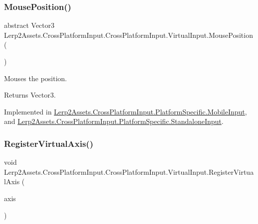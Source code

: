\subsubsection{\texorpdfstring{Mouse\+Position()}{MousePosition()}}
{\footnotesize\ttfamily abstract Vector3 Lerp2\+Assets.\+Cross\+Platform\+Input.\+Cross\+Platform\+Input.\+Virtual\+Input.\+Mouse\+Position (\begin{DoxyParamCaption}{ }\end{DoxyParamCaption})\hspace{0.3cm}{\ttfamily [pure virtual]}}



Mouses the position. 

\begin{DoxyReturn}{Returns}
Vector3.
\end{DoxyReturn}


Implemented in \hyperlink{class_lerp2_assets_1_1_cross_platform_input_1_1_platform_specific_1_1_mobile_input_a94adeaf9c456a99d669348e16a381d88}{Lerp2\+Assets.\+Cross\+Platform\+Input.\+Platform\+Specific.\+Mobile\+Input}, and \hyperlink{class_lerp2_assets_1_1_cross_platform_input_1_1_platform_specific_1_1_standalone_input_a1ff080282b92ef258018a7df697f262a}{Lerp2\+Assets.\+Cross\+Platform\+Input.\+Platform\+Specific.\+Standalone\+Input}.

\mbox{\label{class_lerp2_assets_1_1_cross_platform_input_1_1_cross_platform_input_1_1_virtual_input_a8a142c46ce309abf02de47420161e0ba}} 
\subsubsection{\texorpdfstring{Register\+Virtual\+Axis()}{RegisterVirtualAxis()}}
{\footnotesize\ttfamily void Lerp2\+Assets.\+Cross\+Platform\+Input.\+Cross\+Platform\+Input.\+Virtual\+Input.\+Register\+Virtual\+Axis (\begin{DoxyParamCaption}\item[{\hyperlink{class_lerp2_assets_1_1_cross_platform_input_1_1_cross_platform_input_manager_1_1_virtual_axis}{Cross\+Platform\+Input\+Manager.\+Virtual\+Axis}}]{axis }\end{DoxyParamCaption})\hspace{0.3cm}{\ttfamily [inline]}}



